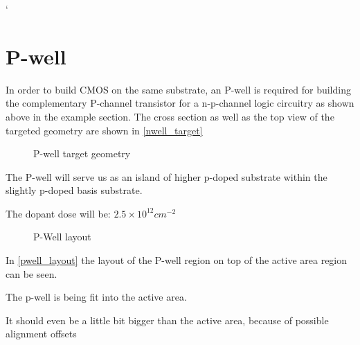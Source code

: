 `\section{P-well}\label{pwell_chapter}
In order to build CMOS on the same substrate, an P-well is required for building the complementary P-channel transistor for a n-p-channel logic circuitry as shown above in the example section.
The cross section as well as the top view of the targeted geometry are shown in \autoref{nwell_target}
\begin{figure}[H]
	\centering
	\begin{tikzpicture}[node distance = 3cm, auto, thick,scale=\CrossAndTopSectionBig, every node/.style={transform shape}]
		
	\end{tikzpicture}
	\begin{tikzpicture}[node distance = 3cm, auto, thick,scale=\CrossAndTopSectionBig, every node/.style={transform shape}]
		
	\end{tikzpicture}
	\caption{P-well target geometry}
	\label{pwell_target}
\end{figure}
The P-well will serve us as an island of higher p-doped substrate within the slightly p-doped basis substrate.

The dopant dose will be: $2.5\times10^{12}cm^{-2}$

\begin{figure}[H]
	\centering
	\begin{tikzpicture}[node distance =1cm, auto, thick,scale=\VLSILayout, every node/.style={transform shape}]
		
	\end{tikzpicture}
	\caption{P-Well layout}
	\label{pwell_layout}
\end{figure}

In \autoref{pwell_layout} the layout of the P-well region on top of the active area region can be seen.

The p-well is being fit into the active area.

It should even be a little bit bigger than the active area, because of possible alignment offsets

\newpage

